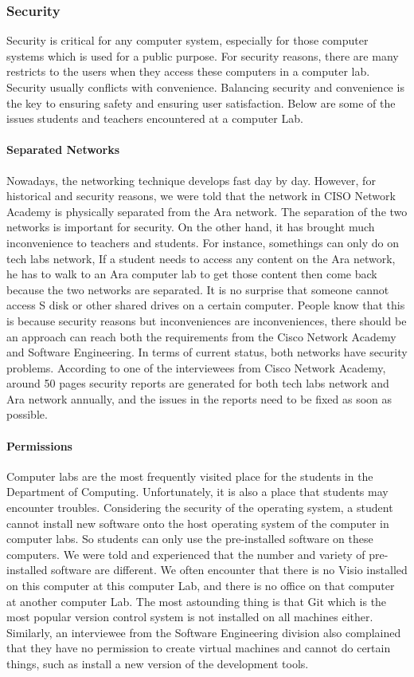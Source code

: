 \subsubsection{Security} 
Security is critical for any computer system, especially for those computer systems which is used for a public purpose. For security reasons, there are many restricts to the users when they access these computers in a computer lab. Security usually conflicts with convenience. Balancing security and convenience is the key to ensuring safety and ensuring user satisfaction. Below are some of the issues students and teachers encountered at a computer Lab.

\paragraph{Separated Networks}
Nowadays, the networking technique develops fast day by day. However, for historical and security reasons, we were told that the network in CISO Network Academy is physically separated from the Ara network. The separation of the two networks is important for security. On the other hand, it has brought much inconvenience to teachers and students. For instance, somethings can only do on tech labs network, If a student needs to access any content on the Ara network, he has to walk to an Ara computer lab to get those content then come back because the two networks are separated. It is no surprise that someone cannot access S disk or other shared drives on a certain computer. People know that this is because security reasons but inconveniences are inconveniences, there should be an approach can reach both the requirements from the Cisco Network Academy and Software Engineering. In terms of current status, both networks have security problems. According to one of the interviewees from Cisco Network Academy, around 50 pages security reports are generated for both tech labs network and Ara network annually, and the issues in the reports need to be fixed as soon as possible.

\paragraph{Permissions}
Computer labs are the most frequently visited place for the students in the Department of Computing. Unfortunately, it is also a place that students may encounter troubles. Considering the security of the operating system, a student cannot install new software onto the host operating system of the computer in computer labs. So students can only use the pre-installed software on these computers. We were told and experienced that the number and variety of pre-installed software are different. We often encounter that there is no Visio installed on this computer at this computer Lab, and there is no office on that computer at another computer Lab. The most astounding thing is that Git which is the most popular version control system is not installed on all machines either. Similarly, an interviewee from the Software Engineering division also complained that they have no permission to create virtual machines and cannot do certain things, such as install a new version of the development tools.

